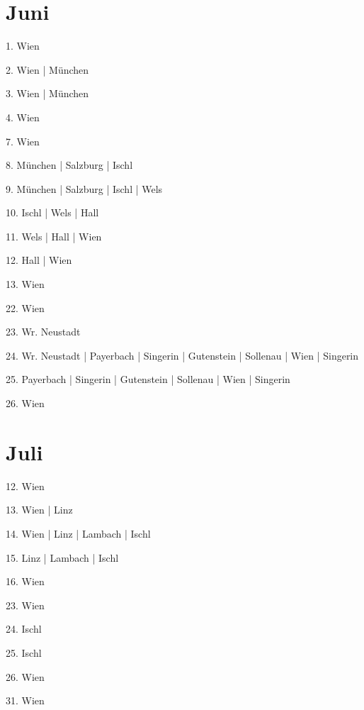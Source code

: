 \documentclass[twoside=false,titlepage=false,open=any, parskip=never, fontsize=10pt, headings=small, chapterprefix=false, appendixprefix=false, DIV=15]{scrbook}
\begin{document}
\begin{multicols}{3}
            \section*{Juni}
            1. Wien\par
            2. Wien | München\par
            3. Wien | München\par
            4. Wien\par
            7. Wien\par
            8. München | Salzburg | Ischl\par
            9. München | Salzburg | Ischl | Wels\par
            10. Ischl | Wels | Hall\par
            11. Wels | Hall | Wien\par
            12. Hall | Wien\par
            13. Wien\par
            22. Wien\par
            23. Wr. Neustadt\par
            24. Wr. Neustadt | Payerbach | Singerin | Gutenstein | Sollenau | Wien | Singerin\par
            25. Payerbach | Singerin | Gutenstein | Sollenau | Wien | Singerin\par
            26. Wien\par
            \section*{Juli}
            12. Wien\par
            13. Wien | Linz\par
            14. Wien | Linz | Lambach | Ischl\par
            15. Linz | Lambach | Ischl\par
            16. Wien\par
            23. Wien\par
            24. Ischl\par
            25. Ischl\par
            26. Wien\par
            31. Wien\par

\end{multicols}
\end{document}
